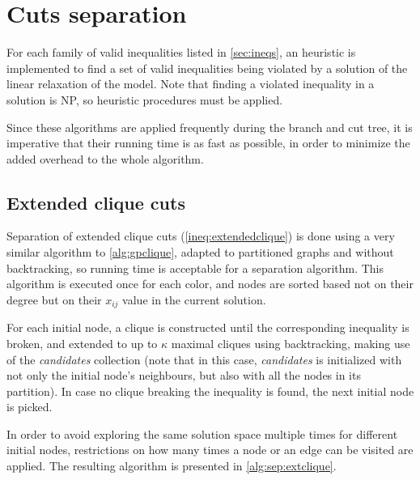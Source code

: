 \section{Cuts separation}

For each family of valid inequalities listed in \ref{sec:ineqs}, an heuristic is implemented to find a set of valid inequalities being violated by a solution of the linear relaxation of the model. Note that finding a violated inequality in a solution is NP, so heuristic procedures must be applied. 

Since these algorithms are applied frequently during the branch and cut tree, it is imperative that their running time is as fast as possible, in order to minimize the added overhead to the whole algorithm.

\subsection{Extended clique cuts}

Separation of extended clique cuts (\ref{ineq:extendedclique}) is done using a very similar algorithm to \ref{alg:gpclique}, adapted to partitioned graphs and without backtracking, so running time is acceptable for a separation algorithm. This algorithm is executed once for each color, and nodes are sorted based not on their degree but on their $x_{ij}$ value in the current solution.

For each initial node, a clique is constructed until the corresponding inequality is broken, and extended to up to $\kappa$ maximal cliques using backtracking, making use of the \textit{candidates} collection (note that in this case, \textit{candidates} is initialized with not only the initial node's neighbours, but also with all the nodes in its partition). In case no clique breaking the inequality is found, the next initial node is picked.

In order to avoid exploring the same solution space multiple times for different initial nodes, restrictions on how many times a node or an edge can be visited are applied. The resulting algorithm is presented in \ref{alg:sep:extclique}.

